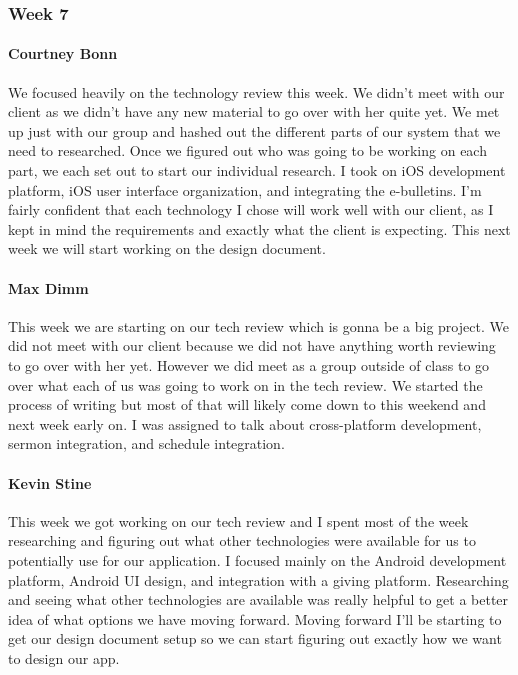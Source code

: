 \documentclass[letterpaper,10pt,draftclsnofoot,onecolumn,titlepage]{IEEEtran}
\begin{document}
		\subsubsection{Week 7}
		
			\paragraph{Courtney Bonn}
			We focused heavily on the technology review this week. We didn't meet with our client as we didn't have any new material to go over with her quite yet. We met up just with our group and hashed out the different parts of our system that we need to researched. Once we figured out who was going to be working on each part, we each set out to start our individual research. I took on iOS development platform, iOS user interface organization, and integrating the e-bulletins. I'm fairly confident that each technology I chose will work well with our client, as I kept in mind the requirements and exactly what the client is expecting. This next week we will start working on the design document.

			\paragraph{Max Dimm}
			This week we are starting on our tech review which is gonna be a big project. We did not meet with our client because we did not have anything worth reviewing to go over with her yet. However we did meet as a group outside of class to go over what each of us was going to work on in the tech review. We started the process of writing but most of that will likely come down to this weekend and next week early on. I was assigned to talk about cross-platform development, sermon integration, and schedule integration.
			
			\paragraph{Kevin Stine}
			This week we got working on our tech review and I spent most of the week researching and figuring out what other technologies were available for us to potentially use for our application. I focused mainly on the Android development platform, Android UI design, and integration with a giving platform. Researching and seeing what other technologies are available was really helpful to get a better idea of what options we have moving forward. Moving forward I'll be starting to get our design document setup so we can start figuring out exactly how we want to design our app.
			
\end{document}
